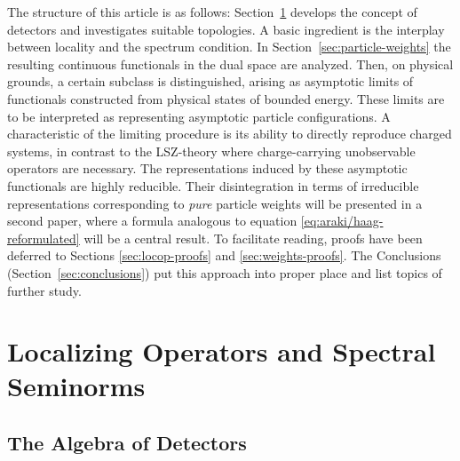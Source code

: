 \documentclass[a4paper,a4paper]{article}
\numberwithin{equation}{section}
\theoremstyle{definition}
\theoremstyle{plain}
\theoremstyle{remark}
\begin{document}
  The structure of this article is as follows:
  Section~\ref{sec:localizing-operators} develops the concept of
  detectors and investigates suitable topologies. A basic ingredient
  is the interplay between locality and the spectrum condition. In
  Section~\ref{sec:particle-weights} the resulting continuous
  functionals in the dual space are analyzed. Then, on physical
  grounds, a certain subclass is distinguished, arising as asymptotic
  limits of functionals constructed from physical states of bounded
  energy. These limits are to be interpreted as representing
  asymptotic particle configurations. A characteristic of the limiting
  procedure is its ability to directly reproduce charged systems, in
  contrast to the LSZ-theory where charge-carrying unobservable
  operators are necessary. The representations induced by these
  asymptotic functionals are highly reducible. Their disintegration in
  terms of irreducible representations corresponding to \emph{pure}
  particle weights will be presented in a second paper, where a
  formula analogous to equation \eqref{eq:araki/haag-reformulated}
  will be a central result. To facilitate reading, proofs have been
  deferred to Sections \ref{sec:locop-proofs} and
  \ref{sec:weights-proofs}. The Conclusions
  (Section~\ref{sec:conclusions}) put this approach into proper place
  and list topics of further study.


\section{Localizing Operators and Spectral Seminorms}
  \label{sec:localizing-operators}

\subsection{The Algebra of Detectors}
  
\end{document}
